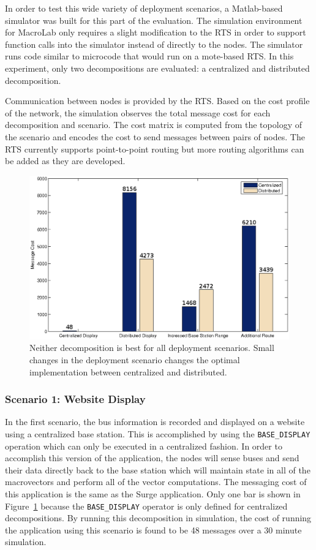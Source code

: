 In order to test this wide variety of deployment scenarios, a Matlab-based
simulator was built for this part of the evaluation.  The simulation environment
for MacroLab only requires a slight modification to the RTS in order to support
function calls into the simulator instead of directly to the nodes.  The
simulator runs code similar to microcode that would run on a mote-based RTS.  In
this experiment, only two decompositions are evaluated: a centralized and
distributed decomposition.

Communication between nodes is provided by the RTS. Based on the cost profile
of the network, the simulation observes the total message cost for each
decomposition and scenario.  The cost matrix is computed from the topology
of the scenario and encodes the cost to send messages between pairs of nodes.
The RTS currently supports point-to-point routing but more routing algorithms
can be added as they are developed.

\begin{figure}[t]
  \centering
  \includegraphics[width=0.8\columnwidth]{fig/scenarioSmall}
  \caption[Effect of deployment scenario on efficient implementation]{Neither
  decomposition is best for all deployment scenarios. Small changes in the
  deployment scenario changes the optimal implementation between centralized and
  distributed.}
  \label{fig:MainResult}
\end{figure}

\subsubsection{Scenario 1: Website Display} 

In the first scenario, the bus information is recorded and displayed on a
website using a centralized base station.  This is accomplished by using the
{\tt BASE\_DISPLAY} operation which can only be executed in a centralized
fashion.  In order to accomplish this version of the application, the nodes will
sense buses and send their data directly back to the base station which will
maintain state in all of the macrovectors and perform all of the vector
computations.  The messaging cost of this application is the same as the Surge
application.  Only one bar is shown in Figure~\ref{fig:MainResult} because the
{\tt BASE\_DISPLAY} operator is only defined for centralized decompositions.  By
running this decomposition in simulation, the cost of running the application
using this scenario is found to be 48 messages over a 30 minute simulation.

